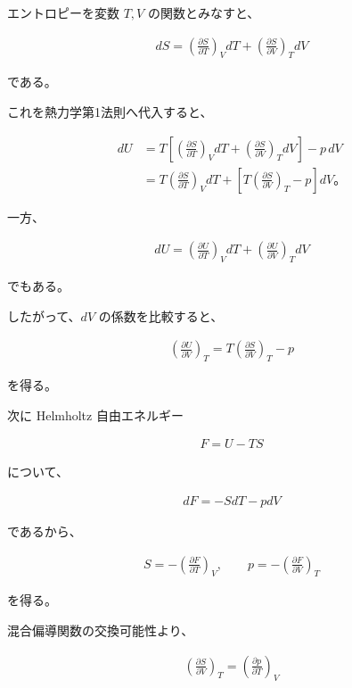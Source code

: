 \documentclass[platex,dvipdfmx,a4paper]{jsarticle}
\begin{document}
エントロピーを変数 $T,V$ の関数とみなすと、

\begin{align*}
dS
=
\left(
\frac{\partial S}{\partial T}
\right)_V dT
+
\left(
\frac{\partial S}{\partial V}
\right)_T dV
\end{align*}

である。

これを熱力学第1法則へ代入すると、

\begin{align*}
dU
&=
T
\left[
\left(
\frac{\partial S}{\partial T}
\right)_V dT
+
\left(
\frac{\partial S}{\partial V}
\right)_T dV
\right]
-p\,dV \\
&=
T
\left(
\frac{\partial S}{\partial T}
\right)_V dT
+
\left[
T
\left(
\frac{\partial S}{\partial V}
\right)_T
-p
\right]
dV。
\end{align*}

一方、

\begin{align*}
dU
=
\left(
\frac{\partial U}{\partial T}
\right)_V dT
+
\left(
\frac{\partial U}{\partial V}
\right)_T dV
\end{align*}

でもある。

したがって、$dV$ の係数を比較すると、

\begin{align*}
\left(
\frac{\partial U}{\partial V}
\right)_T
=
T
\left(
\frac{\partial S}{\partial V}
\right)_T
-p
\end{align*}

を得る。

次に Helmholtz 自由エネルギー

\begin{align*}
F=U-TS
\end{align*}

について、

\begin{align*}
dF
=
-SdT-pdV
\end{align*}

であるから、

\begin{align*}
S
=
-\left(
\frac{\partial F}{\partial T}
\right)_V,
\qquad
p
=
-\left(
\frac{\partial F}{\partial V}
\right)_T
\end{align*}

を得る。

混合偏導関数の交換可能性より、

\begin{align*}
\left(
\frac{\partial S}{\partial V}
\right)_T
=
\left(
\frac{\partial p}{\partial T}
\right)_V
\end{align*}
\end{document}
